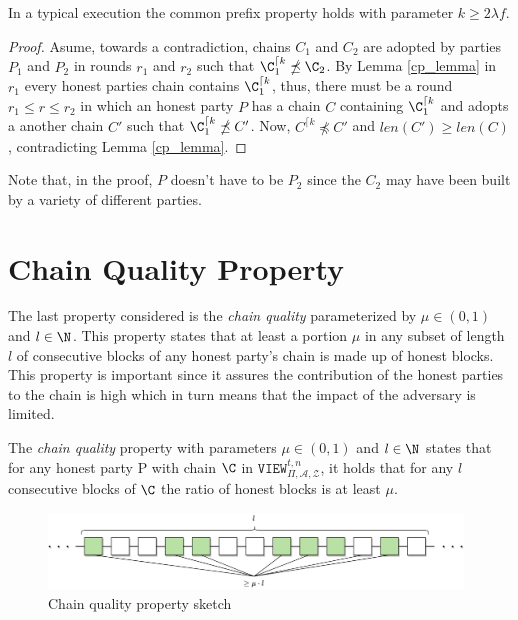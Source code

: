 \documentclass[..]{subfiles}
\begin{document}
\begin{theorem}
	In a typical execution the common prefix property holds with parameter $k \ge 2 \lambda f$.
\end{theorem}
\begin{proof}
	Asume, towards a contradiction, chains $C_1$ and $C_2$ are adopted by parties $P_1$ and $P_2$ in rounds $r_1$ and $r_2$ such that $\C_1^{\lceil k} \npreceq \C_2$. By Lemma \ref{cp_lemma} in $r_1$ every honest parties chain contains $\C_1^{\lceil k}$, thus, there must be a round $r_1 \le r \le r_2$ in which an honest party $P$ has a chain $C$ containing $\C_1^{\lceil k}$ and adopts a another chain $C'$ such that $\C_1^{\lceil k} \npreceq C'$. Now, $C^{\lceil k} \npreceq C'$ and $len(C') \ge len(C)$, contradicting Lemma \ref{cp_lemma}.
\end{proof}
Note that, in the proof, $P$ doesn't have to be $P_2$ since the $C_2$ may have been built by a variety of different parties.



\section{Chain Quality Property}

The last property considered is the \textit{chain quality} parameterized by $\mu \in (0, 1)$ and $l \in \N$. This property states that at least a portion $\mu$ in any subset of length $l$ of consecutive blocks of any honest party's chain is made up of honest blocks. This property is important since it assures the contribution of the honest parties to the chain is high which in turn means that the impact of the adversary is limited.

\begin{definition}
	\normalfont
	The \textit{chain quality} property with parameters $\mu \in (0,1)$ and $l \in \N$ states that for any honest party P with chain $\C$ in $\texttt{VIEW}_{\Pi, \mathcal{A}, \mathcal{Z}}^{t, n}$, it holds that for any $l$ consecutive blocks of $\C$ the ratio of honest blocks is at least $\mu$.
\end{definition}

\begin{figure}[h]
	\begin{center}
		\includegraphics[width=0.98\textwidth]{figures/chain_quality.png}
	\end{center}
	\caption{Chain quality property sketch}
	\label{fig:cq}
\end{figure}
\end{document}
